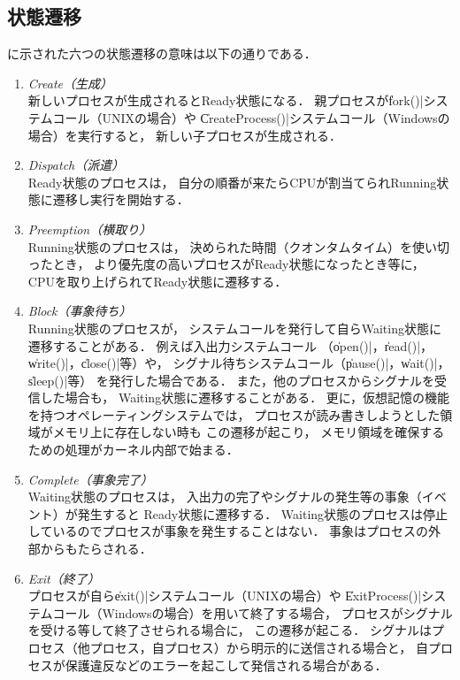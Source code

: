 \subsection{状態遷移}
に示された六つの状態遷移の意味は以下の通りである．

\begin{enumerate}
\item \emph{Create（生成）} \\
  新しいプロセスが生成されるとReady状態になる．
  親プロセスが\|fork()|システムコール（UNIXの場合）や
  \|CreateProcess()|システムコール（Windowsの場合）を実行すると，
  新しい子プロセスが生成される．
\item \emph{Dispatch（派遣）} \\
  Ready状態のプロセスは，
  自分の順番が来たらCPUが割当てられRunning状態に遷移し実行を開始する．
\item \emph{Preemption（横取り）} \\
  Running状態のプロセスは，
  決められた時間（クオンタムタイム）を使い切ったとき，
  より優先度の高いプロセスがReady状態になったとき等に，
  CPUを取り上げられてReady状態に遷移する．
\item \emph{Block（事象待ち）} \\
  Running状態のプロセスが，
  システムコールを発行して自らWaiting状態に遷移することがある．
  例えば入出力システムコール
  （\|open()|，\|read()|，\|write()|，\|close()|等）や，
  シグナル待ちシステムコール（\|pause()|，\|wait()|，\|sleep()|等）
  を発行した場合である．
  また，他のプロセスからシグナルを受信した場合も，
  Waiting状態に遷移することがある．
  更に，仮想記憶の機能を持つオペレーティングシステムでは，
  プロセスが読み書きしようとした領域がメモリ上に存在しない時も
  この遷移が起こり，
  メモリ領域を確保するための処理がカーネル内部で始まる．
\item \emph{Complete（事象完了）} \\
  Waiting状態のプロセスは，
  入出力の完了やシグナルの発生等の事象（イベント）が発生すると
  Ready状態に遷移する．
  Waiting状態のプロセスは停止しているのでプロセスが事象を発生することはない．
  事象はプロセスの外部からもたらされる．
\item \emph{Exit（終了）} \\
  プロセスが自ら\|exit()|システムコール（UNIXの場合）や
  \|ExitProcess()|システムコール（Windowsの場合）を用いて終了する場合，
  プロセスがシグナルを受ける等して終了させられる場合に，
  この遷移が起こる．
  シグナルはプロセス（他プロセス，自プロセス）から明示的に送信される場合と，
  自プロセスが保護違反などのエラーを起こして発信される場合がある．
\end{enumerate}


